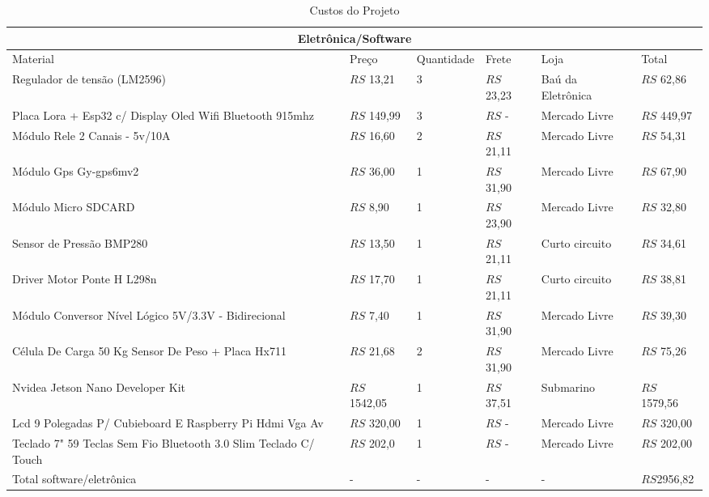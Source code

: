 \begin{table}[h!]
\centering
\begin{tabular}{| m{4cm}|m{2cm}|m{2cm}|m{2cm}|m{2cm}|m{2cm}|}
\hline 
\multicolumn{6}{|c|}{\textbf{Eletrônica/Software}}\\\hline
Material & Preço  & Quantidade & Frete & Loja & Total  \\\hline
Regulador de tensão (LM2596) & $RS$ 13,21 & 3 & $RS$ 23,23 & Baú da Eletrônica & $RS$ 62,86 \\\hline
Placa Lora + Esp32 c/ Display Oled Wifi Bluetooth 915mhz& $RS$ 149,99 & 3 & $RS$ -  & Mercado Livre & $RS$ 449,97 \\\hline
Módulo Rele 2 Canais - 5v/10A & $RS$ 16,60 & 2 & $RS$ 21,11 & Mercado Livre & $RS$ 54,31 \\\hline
Módulo Gps Gy-gps6mv2 & $RS$ 36,00 & 1 & $RS$ 31,90 & Mercado Livre & $RS$ 67,90 \\\hline
Módulo Micro SDCARD & $RS$ 8,90 & 1 & $RS$ 23,90 & Mercado Livre & $RS$ 32,80 \\\hline
Sensor de Pressão BMP280 & $RS$ 13,50 & 1 & $RS$ 21,11 & Curto circuito & $RS$ 34,61 \\\hline
Driver Motor Ponte H L298n & $RS$ 17,70 & 1 & $RS$ 21,11 & Curto circuito & $RS$ 38,81 \\\hline
Módulo Conversor Nível Lógico 5V/3.3V - Bidirecional  & $RS$ 7,40 & 1 & $RS$ 31,90 & Mercado Livre  & $RS$ 39,30 \\\hline
Célula De Carga 50 Kg Sensor De Peso + Placa Hx711  & $RS$ 21,68 & 2 & $RS$ 31,90 & Mercado Livre  & $RS$ 75,26\\\hline
Nvidea Jetson Nano Developer Kit & $RS$ 1542,05 & 1 & $RS$ 37,51 & Submarino  & $RS$ 1579,56\\\hline
Lcd 9 Polegadas P/ Cubieboard E Raspberry Pi Hdmi Vga Av & $RS$ 320,00 & 1 & $RS$ - & Mercado Livre  & $RS$ 320,00\\\hline
Teclado 7" 59 Teclas Sem Fio Bluetooth 3.0 Slim Teclado C/ Touch & $RS$ 202,0 & 1 & $RS$ - & Mercado Livre  & $RS$ 202,00\\\hline
Total software/eletrônica & - & - & - & - & $RS$2956,82  \\\hline




\end{tabular}
\caption{Custos do Projeto}
\label{tab:custos2}
\end{table}
